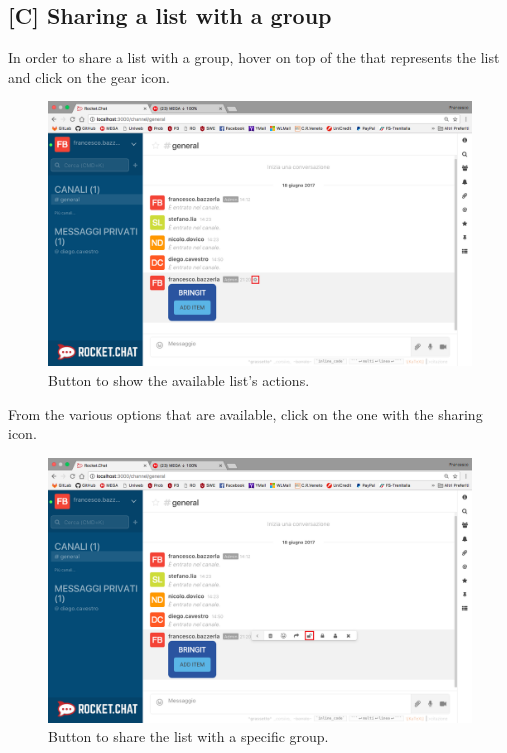 \newpage
\subsection{[C] Sharing a list with a group}
In order to share a list with a group, hover on top of the  that represents the list and click on the gear icon.

\begin{figure}[H]
  \centering 
  \includegraphics[width=\textwidth]{Sections/3-HowToUse/Images/bubble_options_button.png}
  \caption{Button to show the available list's actions.}
\end{figure}

From the various options that are available, click on the one with the sharing icon.

\begin{figure}[H]
  \centering 
  \includegraphics[width=\textwidth]{Sections/3-HowToUse/Images/bubble_option_share_group.png}
  \caption{Button to share the list with a specific group.}
\end{figure}

